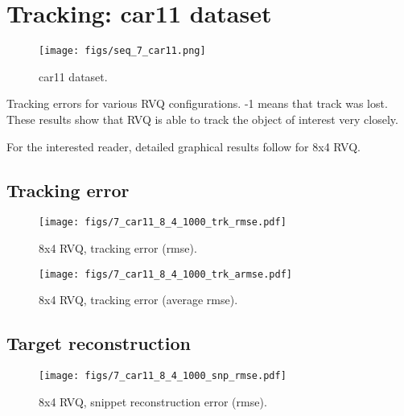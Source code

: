 \clearpage
\newpage
\section{Tracking: car11 dataset} 
								\begin{figure}[h!]
								\centering
								\texttt{[image: figs/seq\_7\_car11.png]}
								\caption{car11 dataset.}
								\label{fig:seq_7_car11}
								\end{figure}



\begin{table}[h]
\centering

\caption{Tracking errors for various RVQ configurations.  -1 means that track was lost.  These results show that RVQ is able to track the object of interest very closely.}
\end{table}

For the interested reader, detailed graphical results follow for 8x4 RVQ.
\clearpage
\newpage
\subsection{Tracking error}

								\begin{figure}[h!]
								\centering
								\texttt{[image: figs/7\_car11\_8\_4\_1000\_trk\_rmse.pdf]}
								\caption{8x4 RVQ, tracking error (rmse).}
								\label{fig:7_car11_8_4_1000_trk_rmse}
								\end{figure}


								\begin{figure}[h!]
								\centering
								\texttt{[image: figs/7\_car11\_8\_4\_1000\_trk\_armse.pdf]}
								\caption{8x4 RVQ, tracking error (average rmse).}
								\label{fig:7_car11_8_4_1000_trk_avg_rmse}
								\end{figure}

\clearpage
\newpage
\subsection{Target reconstruction}

								\begin{figure}[h!]
								\centering
								\texttt{[image: figs/7\_car11\_8\_4\_1000\_snp\_rmse.pdf]}
								\caption{8x4 RVQ, snippet reconstruction error (rmse).}
								\label{fig:7_car11_8_4_1000_snp_rmse}
								\end{figure}


